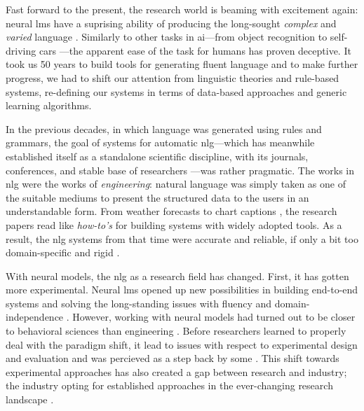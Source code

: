 Fast forward to the present, the research world is beaming with excitement again: neural \acp{lm} have a suprising ability of producing the long-sought \textit{complex} and \textit{varied} language \cite{radford2019language,brown2020language}. Similarly to other tasks in \ac{ai}---from object recognition \cite{papert1966summer} to self-driving cars \cite{autonomouscars}---the apparent ease of the task for humans has proven deceptive. It took us 50 years to build tools for generating fluent language and to make further progress, we had to shift our attention from linguistic theories and rule-based systems, re-defining our systems in terms of data-based approaches and generic learning algorithms.

In the previous decades, in which language was generated using rules and grammars, the goal of systems for automatic \ac{nlg}---which has meanwhile established itself as a standalone scientific discipline, with its journals, conferences, and stable base of researchers \cite{ACLanthologySIGGEN}---was rather pragmatic.
The works in \ac{nlg} were the works of \textit{engineering}: natural language was simply taken as one of the suitable mediums to present the structured data to the users in an understandable form. From weather forecasts \cite{belzAutomaticGenerationWeather2008} to chart captions \cite{demirSummarizingInformationGraphics2012}, the research papers read like \textit{how-to's} for building systems with widely adopted tools. As a result, the \ac{nlg} systems from that time were accurate and reliable, if only a bit too domain-specific and rigid \cite{reiterBuildingAppliedNatural1997,gattSurveyStateArt2018}.


With neural models, the  \ac{nlg} as a research field has changed. First, it has gotten more experimental. Neural \acp{lm} opened up new possibilities in building end-to-end systems and solving the long-standing issues with fluency and domain-independence \cite{ferreiraNeuralDatatotextGeneration2019,dusekEvaluatingStateoftheartEndtoEnd2020,sharmaInnovationsNeuralDatatotext2022}. However, working with neural models had turned out to be closer to behavioral sciences than engineering \cite{holtzmanGenerativeModelsComplex2023}. Before researchers learned to properly deal with the paradigm shift, it lead to issues with respect to experimental design and evaluation \cite{gehrmannRepairingCrackedFoundation2022} and was percieved as a step back by some \cite{reiter2020academic}. This shift towards experimental approaches has also created a gap between research and industry; the industry opting for established approaches in the ever-changing research landscape \cite{daleNaturalLanguageGeneration2020,daleNavigatingTextGeneration2023}.


